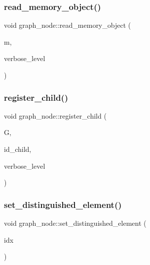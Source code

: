 \subsubsection{\texorpdfstring{read\+\_\+memory\+\_\+object()}{read\_memory\_object()}}
{\footnotesize\ttfamily void graph\+\_\+node\+::read\+\_\+memory\+\_\+object (\begin{DoxyParamCaption}\item[{\mbox{\hyperlink{classmemory__object}{memory\+\_\+object}} $\ast$}]{m,  }\item[{\mbox{\hyperlink{galois_8h_a09fddde158a3a20bd2dcadb609de11dc}{I\+NT}}}]{verbose\+\_\+level }\end{DoxyParamCaption})}

\mbox{\label{classgraph__node_af7113789b1dc112ae5b926ef82ea4f7b}} 
\subsubsection{\texorpdfstring{register\+\_\+child()}{register\_child()}}
{\footnotesize\ttfamily void graph\+\_\+node\+::register\+\_\+child (\begin{DoxyParamCaption}\item[{\mbox{\hyperlink{classlayered__graph}{layered\+\_\+graph}} $\ast$}]{G,  }\item[{\mbox{\hyperlink{galois_8h_a09fddde158a3a20bd2dcadb609de11dc}{I\+NT}}}]{id\+\_\+child,  }\item[{\mbox{\hyperlink{galois_8h_a09fddde158a3a20bd2dcadb609de11dc}{I\+NT}}}]{verbose\+\_\+level }\end{DoxyParamCaption})}

\mbox{\label{classgraph__node_ae014feef00457e1cc7620b76da08df8a}} 
\subsubsection{\texorpdfstring{set\+\_\+distinguished\+\_\+element()}{set\_distinguished\_element()}}
{\footnotesize\ttfamily void graph\+\_\+node\+::set\+\_\+distinguished\+\_\+element (\begin{DoxyParamCaption}\item[{\mbox{\hyperlink{galois_8h_a09fddde158a3a20bd2dcadb609de11dc}{I\+NT}}}]{idx }\end{DoxyParamCaption})}

